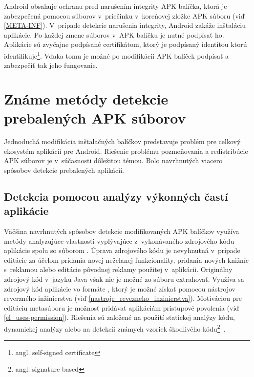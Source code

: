 Android obsahuje ochranu pred narušením integrity APK balíčka, ktorá je zabezpečená pomocou súborov v~priečinku  v~koreňovej zložke APK súboru (viď \ref{META-INF}). V~prípade detekcie narušenia integrity, Android zakáže inštaláciu aplikácie. Po každej zmene súborov v~APK balíčku je nutné podpísať ho. Aplikácie sú zvyčajne podpísané certifikátom, ktorý je podpísaný identitou ktorú identifikuje\footnote{angl. self-signed certificate}. Vďaka tomu je možné po modifikácii APK balíček podpísať a zabezpečiť tak jeho fungovanie.

\section{Známe metódy detekcie prebalených APK súborov}
Jednoduchá modifikácia inštalačných balíčkov predstavuje problém pre celkový ekosystém aplikácií pre Android. Riešenie problému pozmeňovania a redistribúcie APK súborov je v~súčasnosti dôležitou témou. Bolo navrhnutých viacero spôsobov detekcie prebalených aplikácií. 

\subsection{Detekcia pomocou analýzy výkonných častí aplikácie}
Väčšina navrhnutých spôsobov detekcie modifikovaných APK balíčkov využíva metódy analyzujúce vlastnosti vyplývajúce z~vykonávaného zdrojového kódu aplikácie spolu so súborom . Úprava zdrojového kódu je nevyhnutná v~prípade editácie za účelom pridania novej neželanej funkcionality, pridania nových knižníc s~reklamou alebo editácie pôvodnej reklamy použitej v~aplikácii. Originálny zdrojový kód v~jazyku Java však nie je možné zo súboru  extrahovať. Využíva sa zdrojový kód aplikácie vo formáte , ktorý je možné získať pomocou nástrojov reverzného inžinierstva (viď \ref{nastroje_revezneho_inzinierstva}). Motiváciou pre editáciu metasúboru  je možnosť pridávať aplikáciám prístupové povolenia (viď \ref{el_uses-permission}).
Riešenia sú založené na použití statickej analýzy kódu, dynamickej analýzy alebo na detekcii známych vzoriek škodlivého kódu\footnote{angl. signature based}~\cite{Huang2013,Chen2015,Milanova2005,Levchenko2011,Hanna2013,Zhou2012,Potharaju2012}.
	
